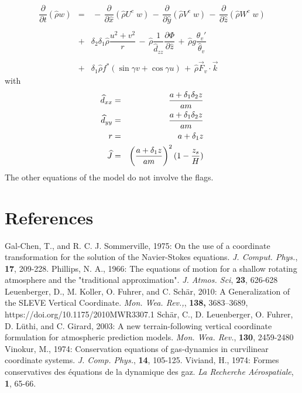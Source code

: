 \begin{eqnarray}
\\
& & \nonumber \\
\dfrac{\partial}{\partial t}(\widehat{\rho} w) &= &
 \, - \, \dfrac{\partial }{\partial \widehat{x}} (\widehat{\rho} U^{c }\;    w)
 \, - \, \dfrac{\partial }{\partial \widehat{y}} (\widehat{\rho} V^{c }\;   w )
 \, - \, \dfrac{\partial }{\partial \widehat{z}} (\widehat{\rho} W^{c }\;  w)
\nonumber \\ & & \nonumber \\
 & + & \delta _{2}\delta _{1}\widehat{\rho}\dfrac{ u ^{2}+ v ^{2} }{r}
 \,  - \, \widehat{\rho}\dfrac{1}{\widehat{d}_{zz}} \dfrac{\partial \Phi}{\partial \widehat{z}}
\, + \,\widehat{\rho} g \dfrac{\theta_v ' }{\widehat{\theta}_v}\nonumber \\
& & \nonumber \\
&  + &\delta _{1}\widehat{\rho} f^{*}(\sin\gamma  v  + \cos\gamma  u )
 \, + \, \widehat{\rho} \vec{F}_{v} \cdot \vec{k}
 \end{eqnarray}
with
\begin{eqnarray}
\widehat{d}_{xx}&=&\dfrac{a+\delta_1 \delta_2 z}{am} \nonumber \\
\widehat{d}_{yy}&=&\dfrac{a+\delta_1 \delta_2 z}{am} \nonumber \\
r &=& a + \delta_1 z \\
\widehat{J} &=& \left( \dfrac{a+\delta_1 z}{am} \right)^2 (1 - {z_s \over H }) \nonumber
\end{eqnarray}
The other equations of the model do not involve the flags.


\section{References}
\decrefname
Gal-Chen, T., and R. C. J. Sommerville, 1975:
On the use of a coordinate transformation for the solution
of the Navier-Stokes equations.
{\it J. Comput. Phys.}, {\bf 17}, 209-228.
\decrefname
Phillips, N. A., 1966:
The equations of motion for a shallow rotating atmosphere and the "traditional approximation".
{\it J. Atmos. Sci}, {\bf 23}, 626-628
\decrefname
Leuenberger, D., M. Koller, O. Fuhrer, and C. Sch\"ar, 2010:
A Generalization of the SLEVE Vertical Coordinate.
{\it Mon. Wea. Rev.,}, {\bf 138,} 3683–3689, https://doi.org/10.1175/2010MWR3307.1
\decrefname
Sch\"ar,  C., D. Leuenberger,  O. Fuhrer,  D. L\"uthi, and C. Girard, 2003:
A new terrain-following vertical coordinate formulation
for atmospheric prediction models.
{\it Mon. Wea. Rev.}, {\bf 130}, 2459-2480 
\decrefname
Vinokur, M., 1974:
Conservation equations of gas-dynamics in curvilinear coordinate systems.
{\it J. Comp. Phys.}, {\bf 14},  105-125.
\decrefname
Viviand, H., 1974:
Formes conservatives des \'equations de la dynamique des gaz.
{\it La Recherche A\'erospatiale}, {\bf 1}, 65-66.

